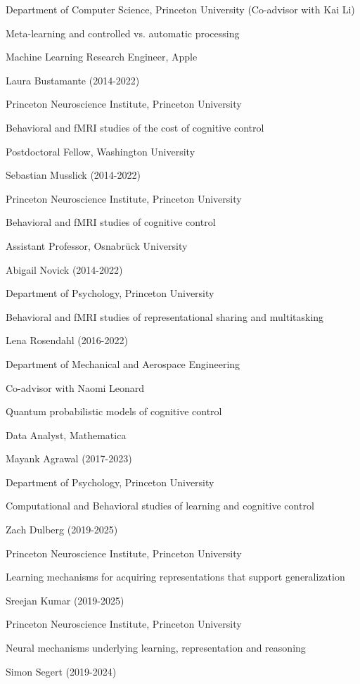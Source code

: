 \documentclass[10 pt]{article}
\begin{document}
Department of Computer Science, Princeton University (Co-advisor with Kai Li)

Meta-learning and controlled vs. automatic processing

Machine Learning Research Engineer, Apple
    \medskip

Laura Bustamante (2014-2022)

Princeton Neuroscience Institute, Princeton University

Behavioral and fMRI studies of the cost of cognitive control

Postdoctoral Fellow, Washington University
    \medskip

Sebastian Musslick (2014-2022)

Princeton Neuroscience Institute, Princeton University

Behavioral and fMRI studies of cognitive control

Assistant Professor, Osnabrück University
    \medskip

Abigail Novick (2014-2022)

Department of Psychology, Princeton University

Behavioral and fMRI studies of representational sharing and multitasking
    \medskip

Lena Rosendahl (2016-2022)

Department of Mechanical and Aerospace Engineering

Co-advisor with Naomi Leonard

Quantum probabilistic models of cognitive control

Data Analyst, Mathematica
    \medskip

Mayank Agrawal (2017-2023)

Department of Psychology, Princeton University

Computational and Behavioral studies of learning and cognitive control
    \medskip

Zach Dulberg (2019-2025)

Princeton Neuroscience Institute, Princeton University

Learning mechanisms for acquiring representations that support generalization
    \medskip

Sreejan Kumar (2019-2025)

Princeton Neuroscience Institute, Princeton University

Neural mechanisms underlying learning, representation and reasoning
    \medskip

Simon Segert (2019-2024)
\end{document}
